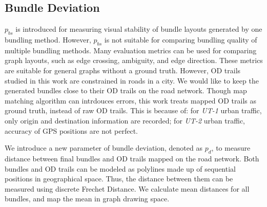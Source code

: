 \subsection{Bundle Deviation}
$p_{bs}$ is introduced for measuring visual stability of bundle layouts generated by one bundling method.
However, $p_{bs}$ is not suitable for comparing bundling quality of multiple bundling methods.
Many evaluation metrics can be used for comparing graph layouts, such as edge crossing, ambiguity, and edge direction.
These metrics are suitable for general graphs without a ground truth.
However, OD trails studied in this work are constrained in roads in a city.
We would like to keep the generated bundles close to their OD trails on the road network.
Though map matching algorithm can intrdouces errors, this work treats mapped OD trails as ground truth, instead of raw OD trails.
This is because of: for \textit{UT-1} urban traffic, only origin and destination information are recorded; for \textit{UT-2} urban traffic, accuracy of GPS positions are not perfect.

We introduce a new parameter of bundle deviation, denoted as $p_{d}$, to measure distance between final bundles and OD trails mapped on the road network.
Both bundles and OD trails can be modeled as polylines made up of sequential positions in geographical space.
Thus, the distance between them can be measured using discrete Frechet Distance.
We calculate mean distances for all bundles, and map the mean in graph drawing space.